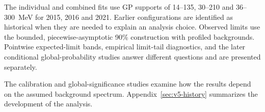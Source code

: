 The individual and combined fits use GP supports of 14--135, 30--210 and
36--300~MeV for 2015, 2016 and 2021. Earlier configurations are identified as
historical when they are needed to explain an analysis choice. Observed limits
use the bounded, piecewise-asymptotic 90\% \CLs{} construction with profiled
backgrounds. Pointwise expected-limit bands, empirical limit-tail diagnostics,
and the later conditional global-probability studies answer different questions
and are presented separately.

The calibration and global-significance studies examine how the results
depend on the assumed background spectrum. Appendix~\ref{sec:v5-history}
summarizes the development of the analysis.

